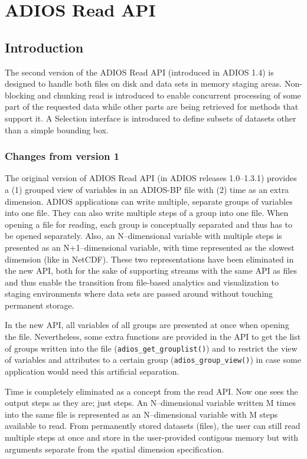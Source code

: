 \chapter{ADIOS Read API}

\section{Introduction}

The second version of the ADIOS Read API (introduced in ADIOS 1.4) is designed to handle both files on disk and data sets in memory staging areas. Non-blocking and chunking read is introduced to enable concurrent processing of some part of the requested data while other parts are being retrieved for methods that support it.  A Selection interface is introduced to define subsets of datasets other than a simple bounding box. 


\subsection{Changes from version 1}
The original version of ADIOS Read API (in ADIOS releases 1.0--1.3.1) provides a (1) grouped view of variables in an ADIOS-BP file with (2) time as an extra dimension. ADIOS applications can write multiple, separate groups of variables into one file. They can also write multiple steps of a group into one file. When opening a file for reading, each group is conceptually separated and thus has to be opened separately. Also, an N--dimensional variable with multiple steps is presented as an N+1--dimensional variable, with time represented as the slowest dimension (like in NetCDF). These two representations have been eliminated in the new API, both for the sake of supporting streams with the same API as files and thus enable the transition from file-based analytics and visualization to staging environments where data sets are passed around without touching permanent storage.

In the new API, all variables of all groups are presented at once when opening the file. Nevertheless, some extra functions are provided in the API to get the list of groups written into the file (\verb+adios_get_grouplist()+) and to restrict the view of variables and attributes to a certain group (\verb+adios_group_view()+) in case some application would need this artificial separation. 

Time is completely eliminated as a concept from the read API. Now one sees the output steps as they are; just steps. An N--dimensional variable written M times into the same file is represented as an N--dimensional variable with M steps available to read. From permanently stored datasets (files), the user can still read multiple steps at once and store in the user-provided contigous memory but with arguments separate from the spatial dimension specification.

